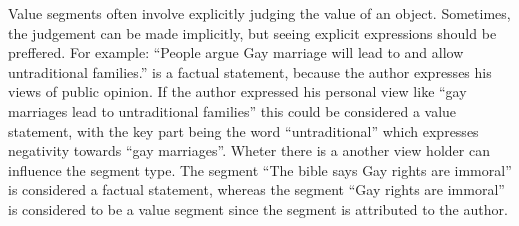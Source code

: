 Value segments often involve explicitly judging the value of an object.
Sometimes, the judgement can be made implicitly, but seeing explicit 
expressions should be preffered. For example: 
``People argue Gay marriage will lead to and allow
untraditional families.'' is a factual statement, because 
the author expresses his views of public opinion. If the author expressed
his personal view like ``gay marriages lead to untraditional families''
this could be considered a value statement, with the key part being
the word ``untraditional'' which expresses negativity towards ``gay marriages''.
Wheter there is a another view holder can influence the segment type. 
The segment ``The bible says Gay rights are immoral'' is considered a factual statement, 
whereas the segment ``Gay rights are immoral'' is considered to be a 
value segment since the segment is attributed to the author. 
